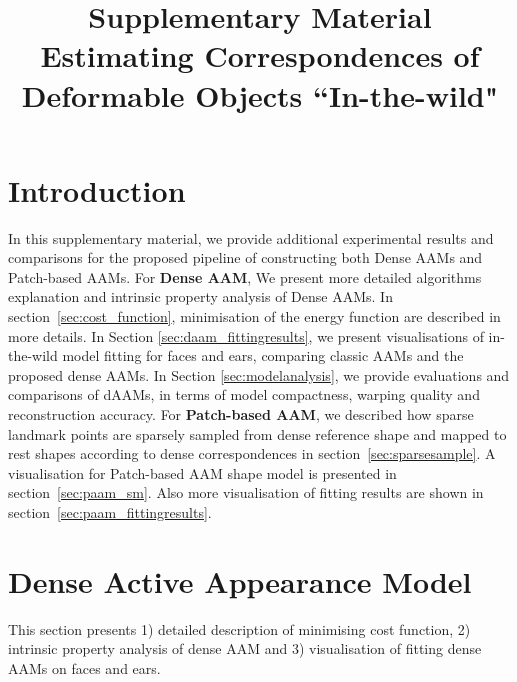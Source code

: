 






\title{Supplementary Material \\ Estimating Correspondences of Deformable Objects ``In-the-wild"}

\maketitle
\thispagestyle{empty}


\section*{Introduction}
In this supplementary material, we provide additional experimental results and comparisons for the proposed pipeline of constructing both Dense AAMs and Patch-based AAMs. 
For \textbf{Dense AAM}, We present more detailed algorithms explanation and intrinsic property analysis of Dense AAMs. In section~\ref{sec:cost_function},  minimisation of the energy function are described in more details. In Section \ref{sec:daam_fittingresults}, we present visualisations of in-the-wild model fitting  for faces and ears, comparing classic AAMs and the proposed dense AAMs. In Section \ref{sec:modelanalysis}, we provide evaluations and comparisons of dAAMs, in terms of model compactness, warping quality and reconstruction accuracy. 
For \textbf{Patch-based AAM}, we described how sparse landmark points are sparsely sampled from dense reference shape and mapped to rest shapes according to dense correspondences in section~\ref{sec:sparsesample}. A visualisation for Patch-based AAM shape model is presented in section~\ref{sec:paam_sm}. Also more visualisation of fitting results are shown in section~\ref{sec:paam_fittingresults}.















\appendix
\section{Dense Active Appearance Model}
\label{sec:daam}
This section presents 1) detailed description of minimising cost function, 2) intrinsic property analysis of dense AAM and 3) visualisation of fitting dense AAMs on faces and ears.

